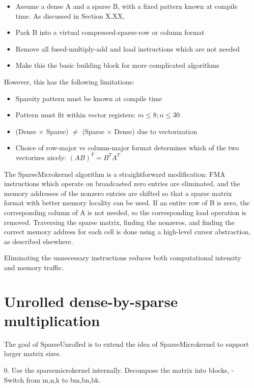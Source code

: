 \begin{itemize}
    \item Assume a dense A and a sparse B, with a fixed pattern known at compile time. As discussed in Section X.XX, 
    \item Pack B into a virtual compressed-sparse-row or column format
    \item Remove all fused-multiply-add and load instructions which are not needed
    \item Make this the basic building block for more complicated algorithms 
\end{itemize}




However, this has the following limitations:
\begin{itemize}
    \item Sparsity pattern must be known at compile time
    \item Pattern must fit within vector registers: $m \leq 8;  n \leq 30$
    \item (Dense $\times$ Sparse) $\neq$ (Sparse $\times$ Dense) due to vectorization
    \item Choice of row-major vs column-major format determines which of the two vectorizes nicely: $(AB)^T = B^T A^T$
\end{itemize}




The SparseMicrokernel algorithm is a straightforward modification: FMA instructions which operate on 
broadcasted zero entries are eliminated, and the memory addresses of the nonzero entries are 
shifted so that a sparse matrix format with better memory locality can be used. If an entire 
row of B is zero, the corresponding column of A is not needed, so the corresponding load 
operation is removed. Traversing the sparse matrix, finding the nonzeros, and finding the correct
memory address for each cell is done using a high-level cursor abstraction, as described elsewhere.   

Eliminating the unnecessary instructions reduces both computational intensity and memory traffic.


\section{Unrolled dense-by-sparse multiplication}

The goal of SparseUnrolled is to extend the idea of SparseMicrokernel to support larger matrix sizes. 

0. Use the sparsemicrokernel internally. Decompose the matrix into blocks, 
  - Switch from m,n,k to bm,bn,bk.


